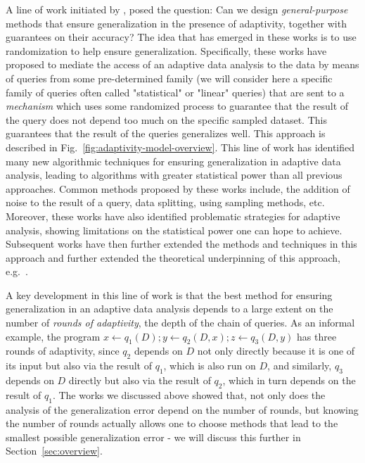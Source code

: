 A line of work initiated by \citet{DworkFHPRR15}, \citet{HardtU14} posed the question: Can we design \emph{general-purpose} methods that ensure generalization in the presence of adaptivity, together with guarantees on their accuracy?  The idea that has emerged in these works is to use randomization to help ensure generalization. Specifically, these works have proposed to mediate the access of an adaptive data analysis to the data by means of queries from some pre-determined family (we will consider here a specific family of queries often called "statistical" or "linear" queries) that are sent to a  \emph{mechanism} which uses some randomized process to guarantee that the result of the query does not depend too much on the specific
sampled dataset. This guarantees that the result of the queries generalizes well. This approach is described in Fig.~\ref{fig:adaptivity-model-overview}.  
This line of work has identified many new algorithmic techniques for ensuring generalization in adaptive data analysis, leading to algorithms with greater statistical power than all previous approaches. Common methods proposed by these works include, the addition of noise to the result of a query, data splitting, using sampling methods, etc. Moreover, these works have also identified problematic strategies for adaptive analysis, showing limitations on the statistical power one can hope to achieve. Subsequent works have then further extended the methods and techniques in this approach and further extended the theoretical underpinning of this approach, e.g.~\cite{dwork2015reusable,dwork2015generalization,BassilyNSSSU16,UllmanSNSS18,FeldmanS17,jung2019new,SteinkeZ20,RogersRSSTW20,DaganK22,Blanc23}.


A key development in this line of work is that the best method for ensuring generalization in an adaptive data analysis depends to a large extent on the number of \emph{rounds of adaptivity}, the depth of the chain of queries. As an informal example, the program $x \leftarrow q_1(D);y \leftarrow q_2(D,x);z \leftarrow q_3(D,y)$ has three rounds of adaptivity, since $q_2$  depends on $D$ not only directly because it is one of its input but also via the result of $q_1$, which is also run on $D$, and similarly,  $q_3$ depends on $D$ directly but also via the result of $q_2$, which in turn depends on the result of $q_1$. The works we discussed above showed that, not only does the analysis of the generalization error depend on the number of rounds, but knowing the number of rounds actually allows one to choose methods that lead to the smallest possible generalization error - we will discuss this further in Section~\ref{sec:overview}. 

